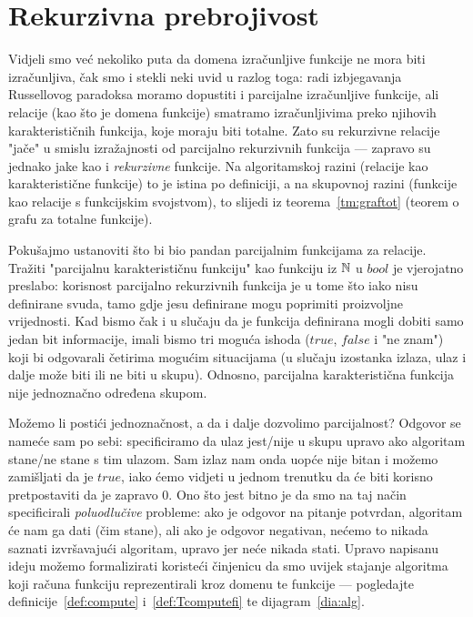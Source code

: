 \chapter{Rekurzivna prebrojivost}\label{ch:re}


Vidjeli smo već nekoliko puta da domena izračunljive funkcije ne mora biti izračunljiva, čak smo i stekli neki uvid u razlog toga: radi izbjegavanja Russellovog paradoksa moramo dopustiti i parcijalne izračunljive funkcije, ali relacije (kao što je domena funkcije) smatramo izračunljivima preko njihovih karakterističnih funkcija, koje moraju biti totalne. Zato su rekurzivne relacije "jače" u smislu izražajnosti od parcijalno rekurzivnih funkcija --- zapravo su jednako jake kao i \emph{rekurzivne} funkcije. Na algoritamskoj razini (relacije kao karakteristične funkcije) to je istina po definiciji, a na skupovnoj razini (funkcije kao relacije s funkcijskim svojstvom), to slijedi iz teorema~\ref{tm:graftot} (teorem o grafu za totalne funkcije).

Pokušajmo ustanoviti što bi bio pandan parcijalnim funkcijama za relacije. Tražiti "parcijalnu karakterističnu funkciju" kao funkciju iz ${\mathbb N}$ u $bool$ je vjerojatno preslabo: korisnost parcijalno rekurzivnih funkcija je u tome što iako nisu definirane svuda, tamo gdje jesu definirane mogu poprimiti proizvoljne vrijednosti. Kad bismo čak i u slučaju da je funkcija definirana mogli dobiti samo jedan bit informacije, imali bismo tri moguća ishoda ($\mathit{true}$, $\mathit{false}$ i "ne znam") koji bi odgovarali četirima mogućim situacijama (u slučaju izostanka izlaza, ulaz i dalje može biti ili ne biti u skupu). Odnosno, parcijalna karakteristična funkcija nije jednoznačno određena skupom.

Možemo li postići jednoznačnost, a da i dalje dozvolimo parcijalnost? Odgovor se nameće sam po sebi: specificiramo da ulaz jest\slash nije u skupu upravo ako algoritam stane\slash ne stane s tim ulazom. Sam izlaz nam onda uopće nije bitan i možemo zamišljati da je $\mathit{true}$, iako ćemo vidjeti u jednom trenutku da će biti korisno pretpostaviti da je zapravo $0$. Ono što jest bitno je da smo na taj način specificirali \emph{poluodlučive} probleme: ako je odgovor na pitanje potvrdan, algoritam će nam ga dati (čim stane), ali ako je odgovor negativan, nećemo to nikada saznati izvršavajući algoritam, upravo jer neće nikada stati. Upravo napisanu ideju možemo formalizirati koristeći činjenicu da smo uvijek stajanje algoritma koji računa funkciju reprezentirali kroz domenu te funkcije --- pogledajte definicije~\ref{def:compute} i~\ref{def:Tcomputefi} te dijagram~\eqref{dia:alg}.


